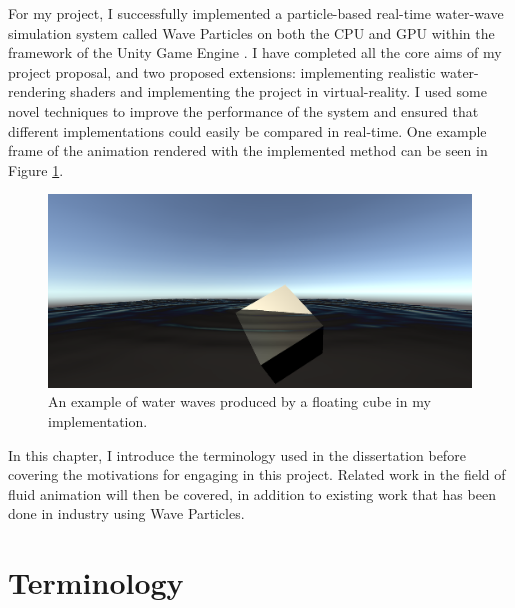 \documentclass[12pt,a4paper,twoside]{report}
\begin{document}
For my project, I successfully implemented a particle-based real-time
water-wave simulation system called Wave Particles on both the CPU and GPU
within the framework of the Unity Game Engine \cite{Yuksel2007}. I have
completed all the core aims of my project proposal, and two proposed
extensions: implementing realistic water-rendering shaders and implementing the
project in virtual-reality. I used some novel techniques to improve the
performance of the system and ensured that different implementations could
easily be compared in real-time. One example frame of the animation rendered
with the implemented method can be seen in Figure
\ref{fig:wave_particles_example_snapshot}.

\begin{figure}[h]
\centering
\includegraphics[width=\textwidth]{wave_particles_default_with_cube_1}
\caption{An example of water waves produced by a floating cube in my
implementation.}
\label{fig:wave_particles_example_snapshot}
\end{figure}

In this chapter, I introduce the terminology used in the dissertation
before covering the motivations for engaging in this project. Related work in
the field of fluid animation will then be covered, in addition to existing work
that has been done in industry using Wave Particles.

\section{Terminology}
\end{document}
